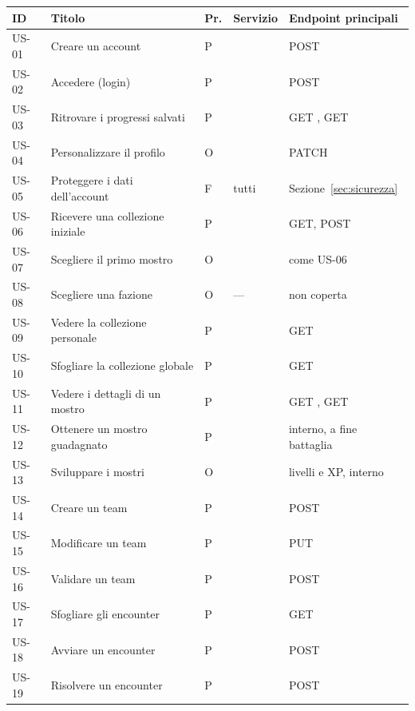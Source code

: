 \documentclass[11pt,a4paper]{article}
\begin{document}
\begin{xltabular}{\linewidth}{@{}L{1.3cm}L{4.2cm}L{0.6cm}L{2.1cm}Y@{}}
  \toprule
  ID & Titolo & Pr. & Servizio & Endpoint principali \\
  \midrule
  \endhead
  US-01 & Creare un account & P &  & POST  \\
  US-02 & Accedere (login) & P &  & POST  \\
  US-03 & Ritrovare i progressi salvati & P &  & GET , GET  \\
  US-04 & Personalizzare il profilo & O &  & PATCH  \\
  US-05 & Proteggere i dati dell'account & F & tutti & Sezione~\ref{sec:sicurezza} \\
  US-06 & Ricevere una collezione iniziale & P &  & GET, POST  \\
  US-07 & Scegliere il primo mostro & O &  & come US-06 \\
  US-08 & Scegliere una fazione & O & — & non coperta \\
  US-09 & Vedere la collezione personale & P &  & GET  \\
  US-10 & Sfogliare la collezione globale & P &  & GET  \\
  US-11 & Vedere i dettagli di un mostro & P &  & GET , GET  \\
  US-12 & Ottenere un mostro guadagnato & P &  & interno, a fine battaglia \\
  US-13 & Sviluppare i mostri & O &  & livelli e XP, interno \\
  US-14 & Creare un team & P &  & POST  \\
  US-15 & Modificare un team & P &  & PUT  \\
  US-16 & Validare un team & P &  & POST  \\
  US-17 & Sfogliare gli encounter & P &  & GET  \\
  US-18 & Avviare un encounter & P &  & POST  \\
  US-19 & Risolvere un encounter & P &  & POST  \\

\end{xltabular}
\end{document}
